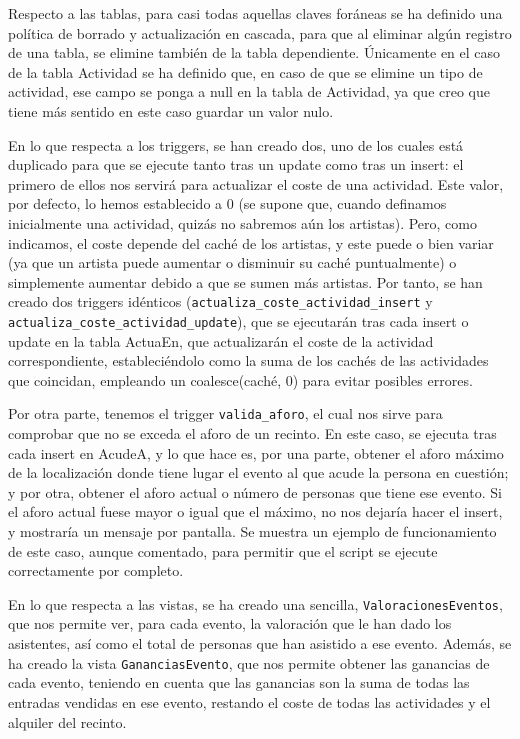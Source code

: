 \documentclass[a4paper,onecolumn]{article}
\begin{document}
\begin{sloppypar}
Respecto a las tablas, para casi todas aquellas claves foráneas se ha definido una política de borrado y actualización en cascada, para que al eliminar 
algún registro de una tabla, se elimine también de la tabla dependiente. Únicamente en el caso de la tabla Actividad se ha definido que, en caso de que 
se elimine un tipo de actividad, ese campo se ponga a null en la tabla de Actividad, ya que creo que tiene más sentido en este caso guardar un valor nulo.

En lo que respecta a los triggers, se han creado dos, uno de los cuales está duplicado para que se ejecute tanto tras un update como tras un insert: 
el primero de ellos nos servirá para actualizar el coste de una actividad. Este valor, por defecto, lo hemos establecido a 0 (se supone que, cuando 
definamos inicialmente una actividad, quizás no sabremos aún los artistas). Pero, como indicamos, el coste depende del caché de los artistas, y este 
puede o bien variar (ya que un artista puede aumentar o disminuir su caché puntualmente) o simplemente aumentar debido a que se sumen más artistas. Por tanto,
se han creado dos triggers idénticos (\texttt{actualiza\_coste\_actividad\_insert} y \texttt{actualiza\_coste\_actividad\_update}), que se ejecutarán tras cada 
insert o update en la tabla ActuaEn, que actualizarán el coste de la actividad correspondiente, estableciéndolo como la suma de los cachés de las actividades 
que coincidan, empleando un coalesce(caché, 0) para evitar posibles errores. 

Por otra parte, tenemos el trigger \texttt{valida\_aforo}, el cual nos sirve para comprobar que no se exceda el aforo de un recinto. En este caso, se 
ejecuta tras cada insert en AcudeA, y lo que hace es, por una parte, obtener el aforo máximo de la localización donde tiene lugar el evento al que acude la 
persona en cuestión; y por otra, obtener el aforo actual o número de personas que tiene ese evento. Si el aforo actual fuese mayor o igual que el máximo, 
no nos dejaría hacer el insert, y mostraría un mensaje por pantalla. Se muestra un ejemplo de funcionamiento de este caso, aunque comentado, para permitir 
que el script se ejecute correctamente por completo.

En lo que respecta a las vistas, se ha creado una sencilla, \texttt{ValoracionesEventos}, que nos permite ver, para cada evento, la valoración que le han 
dado los asistentes, así como el total de personas que han asistido a ese evento. Además, se ha creado la vista \texttt{GananciasEvento}, que nos permite 
obtener las ganancias de cada evento, teniendo en cuenta que las ganancias son la suma de todas las entradas vendidas en ese evento, restando el coste 
de todas las actividades y el alquiler del recinto.


\end{sloppypar}
\end{document}
